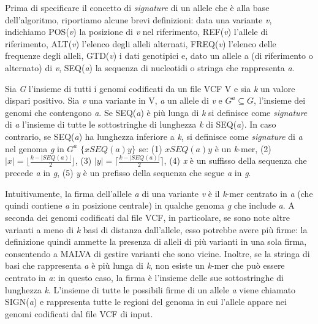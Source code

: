 \documentclass[../main.tex]{subfiles}
\begin{document}
Prima di specificare il concetto di \textit{signature} di un allele che è alla base dell'algoritmo, riportiamo alcune brevi definizioni: data una variante \textit{v}, indichiamo POS(\textit{v}) la posizione di \textit{v} nel riferimento, REF(\textit{v}) l'allele di riferimento, ALT(\textit{v}) l'elenco degli alleli alternati, FREQ(\textit{v}) l'elenco delle frequenze degli alleli, GTD(\textit{v}) i dati genotipici e, dato un allele a (di riferimento o alternato) di \textit{v}, SEQ(\textit{a}) la sequenza di nucleotidi o stringa che rappresenta \textit{a}.

\theoremstyle{definition}
\begin{definition} 

Sia \textit{G} l'insieme di tutti i genomi codificati da un file VCF V e sia \textit{k} un valore dispari positivo. Sia \textit{v} una variante in V, \textit{a} un allele di \textit{v} e $\textit{G}^{a} \subseteq \textit{G}$, l'insieme dei genomi che contengono \textit{a}. Se SEQ(\textit{a}) è più lunga di \textit{k} si definisce come \textit{signature} di \textit{a} l'insieme di tutte le sottostringhe di lunghezza \textit{k} di SEQ(\textit{a}). In caso contrario, se SEQ(\textit{a}) ha lunghezza inferiore a \textit{k}, si definisce come \textit{signature} di \textit{a} nel genoma \textit{g} in $\textit{G}^{a}$ $\{ \textit{x}SEQ(\textit{a})\textit{y} \} $ se: (1) $\textit{x}SEQ(\textit{a})\textit{y}$ è un \textit{k}-mer, (2) $|\textit{x}| = \lfloor \frac{k-|SEQ(\textit{a})|}{2} \rfloor$, (3) $|\textit{y}| = \lceil \frac{k-|SEQ(\textit{a})|}{2} \rceil$, (4) \textit{x} è un suffisso della sequenza che precede \textit{a} in \textit{g}, (5) \textit{y} è un prefisso della sequenza che segue \textit{a} in \textit{g}.

\end{definition}

\noindent
Intuitivamente, la firma dell'allele \textit{a} di una variante \textit{v} è il \textit{k}-mer centrato in \textit{a} (che quindi contiene \textit{a} in posizione centrale) in qualche genoma \textit{g} che include \textit{a}. A seconda dei genomi codificati dal file VCF, in particolare, se sono note altre varianti a meno di \textit{k} basi di distanza dall'allele, esso potrebbe avere più firme: la definizione quindi ammette la presenza di alleli di più varianti in una sola firma, consentendo a MALVA di gestire varianti che sono vicine. Inoltre, se la stringa di basi che rappresenta \textit{a} è più lunga di \textit{k}, non esiste un \textit{k}-mer che può essere centrato in \textit{a}: in questo caso, la firma è l'insieme delle sue sottostringhe di lunghezza \textit{k}. L'insieme di tutte le possibili firme di un allele \textit{a} viene chiamato SIGN(\textit{a}) e rappresenta tutte le regioni del genoma in cui l'allele appare nei genomi codificati dal file VCF di input.
\end{document}
